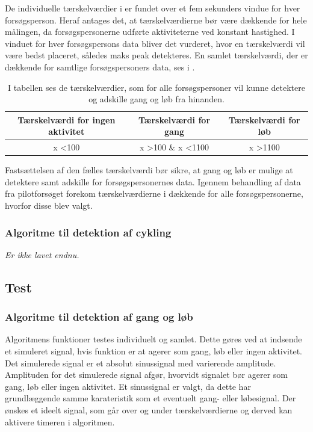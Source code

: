 De individuelle tærskelværdier i  er fundet over et fem sekunders vindue for hver forsøgsperson. Heraf antages det, at tærskelværdierne bør være dækkende for hele målingen, da forsøgspersonerne udførte aktiviteterne ved konstant hastighed. I vinduet for hver forsøgspersons data bliver det vurderet, hvor en tærskelværdi vil være bedst placeret, således maks peak detekteres. En samlet tærskelværdi, der er dækkende for samtlige forsøgspersoners data, ses i .
\begin{table}[H]
	\centering
	\begin{tabular}{ccc}
		\hline
		\rowcolor[HTML]{C0C0C0} 
		Tærskelværdi for ingen aktivitet & Tærskelværdi for gang & Tærskelværdi for løb \\ \hline
		x \textless 100 & x \textgreater 100 \& x \textless 1100 & x \textgreater 1100 \\ \hline
	\end{tabular}
	\caption{I tabellen ses de tærskelværdier, som for alle forsøgspersoner vil kunne detektere og adskille gang og løb fra hinanden.}
	\label{tab:faelles_taerskel}
\end{table}\vspace{-0.5cm}
Fastsættelsen af den fælles tærskelværdi bør sikre, at gang og løb er mulige at detektere samt adskille for forsøgspersonernes data. Igennem behandling af data fra pilotforsøget forekom tærskelværdierne i  dækkende for alle forsøgspersonerne, hvorfor disse blev valgt.



\subsubsection{Algoritme til detektion af cykling}
\textit{Er ikke lavet endnu.}

\subsection{Test}
\subsubsection{Algoritme til detektion af gang og løb}
Algoritmens funktioner testes individuelt og samlet. Dette gøres ved at indsende et simuleret signal, hvis funktion er at agerer som gang, løb eller ingen aktivitet. Det simulerede signal er et absolut sinussignal med varierende amplitude. Amplituden for det simulerede signal afgør, hvorvidt signalet bør agerer som gang, løb eller ingen aktivitet. Et sinussignal er valgt, da dette har grundlæggende samme karateristik som et eventuelt gang- eller løbesignal. Der ønskes et ideelt signal, som går over og under tærskelværdierne og derved kan aktivere timeren i algoritmen.

